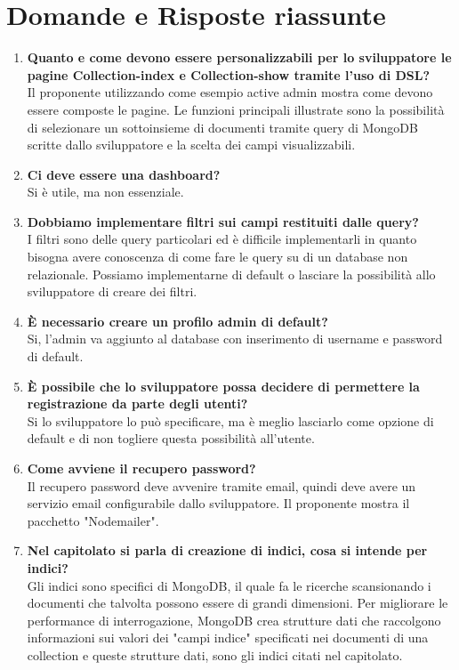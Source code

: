 \section{Domande e Risposte riassunte}
	\begin{enumerate}	 
		\item 
		{\bfseries Quanto e come devono essere personalizzabili per lo sviluppatore le pagine Collection-index
		e Collection-show tramite l'uso di DSL?} \\
		Il proponente utilizzando come esempio active admin mostra come devono essere composte le pagine.
		Le funzioni principali illustrate sono la possibilità di selezionare un sottoinsieme di documenti tramite query di MongoDB scritte
		dallo sviluppatore e la scelta dei campi visualizzabili.	
		
		\item 
		{\bfseries Ci deve essere una dashboard?} \\
		Si è utile, ma non essenziale. 
		
		\item
		{\bfseries Dobbiamo implementare filtri sui campi restituiti dalle query?} \\
		I filtri sono delle query particolari ed è difficile implementarli in quanto bisogna avere conoscenza di come fare le query su di un database non relazionale.
		Possiamo implementarne di default o lasciare la possibilità allo sviluppatore di creare dei filtri.
		
		\item
		{\bfseries È necessario creare un profilo admin di default?} \\
		Si, l'admin va aggiunto al database con inserimento di username e password di default.
		
		\item
		{\bfseries È possibile che lo sviluppatore possa decidere di permettere la registrazione da parte degli utenti?} \\
		 Si lo sviluppatore lo può specificare, ma è meglio lasciarlo come opzione di default e di non togliere questa possibilità
		 all'utente.
		
		\item
		{\bfseries Come avviene il recupero password?} \\
		Il recupero password deve avvenire tramite email, quindi \ProjectName{} deve avere un servizio email configurabile dallo sviluppatore.
		Il proponente mostra il pacchetto "Nodemailer".
		
		\item
		{\bfseries Nel capitolato si parla di creazione di indici, cosa si intende per indici?} \\
		Gli indici sono specifici di MongoDB, il quale fa le ricerche scansionando i documenti che talvolta possono essere di grandi dimensioni. Per migliorare le performance di interrogazione, MongoDB crea strutture dati che raccolgono informazioni sui valori dei "campi indice" specificati nei documenti di una collection e queste strutture dati, sono gli indici citati nel capitolato.
		

\end{enumerate}
